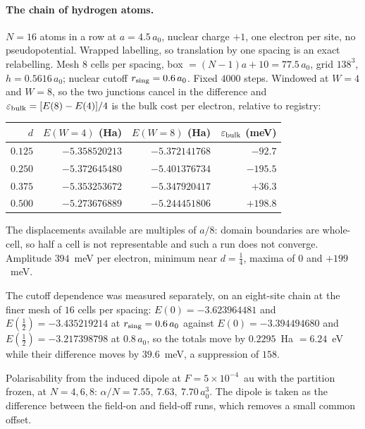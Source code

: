 \documentclass[11pt]{article}
\newcommand{\half}{\tfrac12}
\begin{document}
\paragraph{The chain of hydrogen atoms.} $N=16$ atoms in a row at $a=4.5\,a_0$, nuclear charge
$+1$, one electron per site, no pseudopotential. Wrapped labelling, so translation by one spacing is
an exact relabelling. Mesh $8$ cells per spacing, box $=(N-1)a+10=77.5\,a_0$, grid $138^3$,
$h=0.5616\,a_0$; nuclear cutoff $r_{\rm sing}=0.6\,a_0$. Fixed $4000$ steps. Windowed at $W=4$ and
$W=8$, so the two junctions cancel in the difference and
$\varepsilon_{\rm bulk}=[E(8)-E(4)]/4$ is the bulk cost per electron, relative to registry:
\begin{center}
\small
\begin{tabular}{@{}rrrr@{}}
\toprule
$d$ & $E(W{=}4)$ (Ha) & $E(W{=}8)$ (Ha) & $\varepsilon_{\rm bulk}$ (meV)\\
\midrule
$0.125$ & $-5.358520213$ & $-5.372141768$ & $-92.7$ \\
$0.250$ & $-5.372645480$ & $-5.401376734$ & $-195.5$ \\
$0.375$ & $-5.353253672$ & $-5.347920417$ & $+36.3$ \\
$0.500$ & $-5.273676889$ & $-5.244451806$ & $+198.8$ \\
\bottomrule
\end{tabular}
\end{center}
\noindent The displacements available are multiples of $a/8$: domain boundaries are whole-cell, so
half a cell is not representable and such a run does not converge. Amplitude $394$~meV per electron,
minimum near $d=\tfrac14$, maxima of $0$ and $+199$~meV.

The cutoff dependence was measured separately, on an eight-site chain at the finer mesh of $16$
cells per spacing: $E(0)=-3.623964481$ and $E(\half)=-3.435219214$ at $r_{\rm sing}=0.6\,a_0$
against $E(0)=-3.394494680$ and $E(\half)=-3.217398798$ at $0.8\,a_0$, so the totals move by
$0.2295$~Ha $=6.24$~eV while their difference moves by $39.6$~meV, a suppression of $158$.

Polarisability from the induced dipole at $F=5\times10^{-4}$~au with the partition
frozen, at $N=4,6,8$: $\alpha/N = 7.55,\ 7.63,\ 7.70\,a_0^3$. The dipole is taken as the
difference between the field-on and field-off runs, which removes a small common offset.
\end{document}
